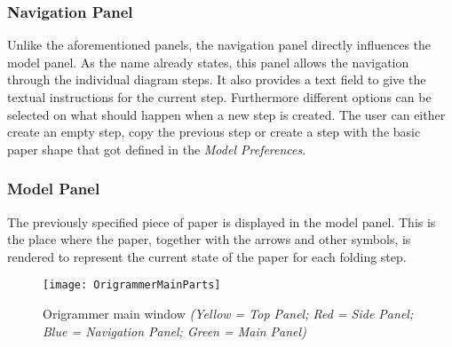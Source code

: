 \subsubsection*{Navigation Panel}
Unlike the aforementioned panels, the navigation panel directly influences the model panel. As the name already states, this panel allows the navigation through the individual diagram steps. It also provides a text field to give the textual instructions for the current step. Furthermore different options can be selected on what should happen when a new step is created. The user can either create an empty step, copy the previous step or create a step with the basic paper shape that got defined in the \emph{Model Preferences}.

\subsubsection*{Model Panel}
The previously specified piece of paper is displayed in the model panel. This is the place where the paper, together with the arrows and other symbols, is rendered to represent the current state of the paper for each folding step.
\begin{figure}[htbp]
	\centering
	\texttt{[image: OrigrammerMainParts]}
	\caption{Origrammer main window \emph{(Yellow = Top Panel; Red = Side Panel; Blue = Navigation Panel; Green = Main Panel)}}
	\label{fig:origrammerMain}
\end{figure}